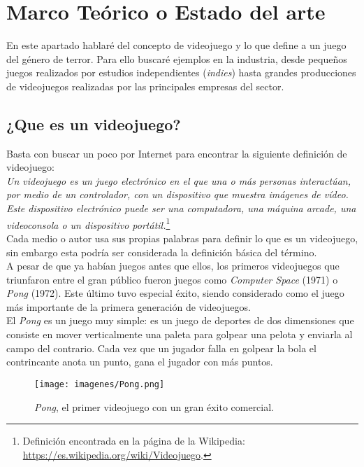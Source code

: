 \chapter{Marco Teórico o  Estado del arte}
\label{marcoteorico}

En este apartado hablaré del concepto de videojuego y lo que define a un juego del género de terror. Para ello buscaré ejemplos en la industria, desde pequeños juegos realizados por estudios independientes (\textit{indies}) hasta grandes producciones de videojuegos realizadas por las principales empresas del sector.

\section{¿Que es un videojuego?}

Basta con buscar un poco por Internet para encontrar la siguiente definición de videojuego:
\\

\textit{Un videojuego es un juego electrónico en el que una o más personas interactúan, por medio de un controlador, con un dispositivo que muestra imágenes de vídeo. Este dispositivo electrónico puede ser una computadora, una máquina arcade, una videoconsola o un dispositivo portátil.}\footnote{Definición encontrada en la página de la Wikipedia: \url{https://es.wikipedia.org/wiki/Videojuego}.}
\\

Cada medio o autor usa sus propias palabras para definir lo que es un videojuego, sin embargo esta podría ser considerada la definición básica del término.
\\

A pesar de que ya habían juegos antes que ellos, los primeros videojuegos que triunfaron entre el gran público fueron juegos como \textit{Computer Space} (1971) o \textit{Pong} (1972). Este último tuvo especial éxito, siendo considerado como el juego más importante de la primera generación de videojuegos.
\\

El \textit{Pong} es un juego muy simple: es un juego de deportes de dos dimensiones que consiste en mover verticalmente una paleta para golpear una pelota y enviarla al campo del contrario. Cada vez que un jugador falla en golpear la bola el contrincante anota un punto, gana el jugador con más puntos.
\\


\begin{figure}
	\begin{center}
		\texttt{[image: imagenes/Pong.png]}
		\caption{\textit{Pong}, el primer videojuego con un gran éxito comercial.}
		\label{spacewar}
	\end{center}
\end{figure}

